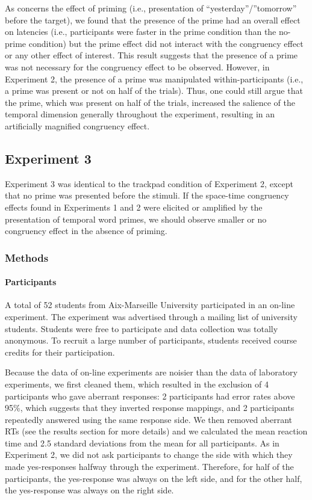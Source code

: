 \documentclass[
  a4paper,12pt,twoside,onecolumn,openright,final,oldfontcommands]{memoir}
\begin{document}
As concerns the effect of priming (i.e., presentation of ``yesterday''/''tomorrow'' before the target), we found that the presence of the prime had an overall effect on latencies (i.e., participants were faster in the prime condition than the no-prime condition) but the prime effect did not interact with the congruency effect or any other effect of interest. This result suggests that the presence of a prime was not necessary for the congruency effect to be observed. However, in Experiment 2, the presence of a prime was manipulated within-participants (i.e., a prime was present or not on half of the trials). Thus, one could still argue that the prime, which was present on half of the trials, increased the salience of the temporal dimension generally throughout the experiment, resulting in an artificially magnified congruency effect.

\hypertarget{experiment-3}{%
\subsection{Experiment 3}\label{experiment-3}}

Experiment 3 was identical to the trackpad condition of Experiment 2, except that no prime was presented before the stimuli. If the space-time congruency effects found in Experiments 1 and 2 were elicited or amplified by the presentation of temporal word primes, we should observe smaller or no congruency effect in the absence of priming.

\hypertarget{methods-2}{%
\subsubsection{Methods}\label{methods-2}}

\hypertarget{participants-2}{%
\paragraph{Participants}\label{participants-2}}

A total of 52 students from Aix-Marseille University participated in an on-line experiment. The experiment was advertised through a mailing list of university students. Students were free to participate and data collection was totally anonymous. To recruit a large number of participants, students received course credits for their participation.

Because the data of on-line experiments are noisier than the data of laboratory experiments, we first cleaned them, which resulted in the exclusion of 4 participants who gave aberrant responses: 2 participants had error rates above 95\%, which suggests that they inverted response mappings, and 2 participants repeatedly answered using the same response side. We then removed aberrant RTs (see the results section for more details) and we calculated the mean reaction time and 2.5 standard deviations from the mean for all participants. As in Experiment 2, we did not ask participants to change the side with which they made yes-responses halfway through the experiment. Therefore, for half of the participants, the yes-response was always on the left side, and for the other half, the yes-response was always on the right side.
\end{document}
